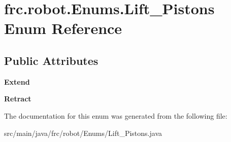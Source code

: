 \hypertarget{enumfrc_1_1robot_1_1_enums_1_1_lift___pistons}{}\section{frc.\+robot.\+Enums.\+Lift\+\_\+\+Pistons Enum Reference}
\label{enumfrc_1_1robot_1_1_enums_1_1_lift___pistons}
\subsection*{Public Attributes}
\begin{DoxyCompactItemize}
\item 
\mbox{\label{enumfrc_1_1robot_1_1_enums_1_1_lift___pistons_a6330e41bb1e82289bb679d21e466cb04}} 
{\bfseries Extend}
\item 
\mbox{\label{enumfrc_1_1robot_1_1_enums_1_1_lift___pistons_a95ac3a721cf39027b6e0bd0ea87f2a13}} 
{\bfseries Retract}
\end{DoxyCompactItemize}


The documentation for this enum was generated from the following file\+:\begin{DoxyCompactItemize}
\item 
src/main/java/frc/robot/\+Enums/Lift\+\_\+\+Pistons.\+java\end{DoxyCompactItemize}
